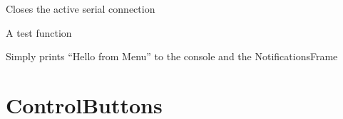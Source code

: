\documentclass[letterpaper,10pt,english,openany,oneside]{sphinxmanual}
\begin{document}
\begin{fulllineitems}
\begin{fulllineitems}
\begin{quote}
\begin{description}
\end{description}\end{quote}

\end{fulllineitems}


\begin{fulllineitems}
\label{\detokenize{src/application:Application.Application.close}}
Closes the active serial connection

\end{fulllineitems}


\begin{fulllineitems}
\label{\detokenize{src/application:Application.Application.hello}}
A test function

Simply prints “Hello from Menu” to the console and the NotificationsFrame

\end{fulllineitems}


\end{fulllineitems}



\chapter{ControlButtons}
\label{\detokenize{src/controlbuttons:module-ControlButtons}}\label{\detokenize{src/controlbuttons:controlbuttons}}\label{\detokenize{src/controlbuttons::doc}}
\end{document}
